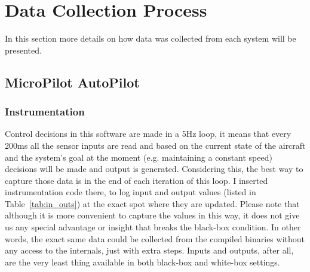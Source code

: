 

\section{Data Collection Process}
In this section more details on how data was collected from each system will be presented. 

\subsection{MicroPilot AutoPilot}
\subsubsection{Instrumentation}
Control decisions in this software are made in a 5Hz loop, it means that every 200ms all the sensor inputs are read and based on the current state of the aircraft and the system's goal at the moment (e.g. maintaining a constant speed) decisions will be made and output is generated. Considering this, the best way to capture those data is in the end of each iteration of this loop. I inserted instrumentation code there, to log input and output values (listed in Table~\ref{tab:in_outs}) at the exact spot where they are updated. 
Please note that although it is more convenient to capture the values in this way, it does not give us any special advantage or insight that breaks the black-box condition. In other words, the exact same data could be collected from the compiled binaries without any access to the internals, just with extra steps. Inputs and outputs, after all, are the very least thing available in both black-box and white-box settings.

